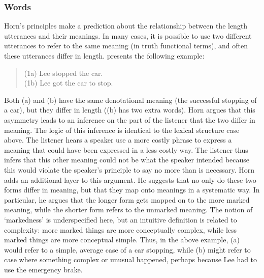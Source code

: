 \documentclass[man, noapacite, 12pt]{apa2}
\begin{document}
\subsubsection{Words}
Horn's principles make a prediction about the relationship between the length utterances and their meanings. In many cases, it is possible to use two different utterances to refer to the same meaning (in truth functional terms), and often these utterances differ in length.  presents the following example: 
\begin{quote} 
 	(1a) Lee stopped the car.\\
	(1b) Lee got the car to stop.
	
\end{quote}
Both (a) and (b) have the same denotational meaning (the successful stopping of a car), but they differ in length ((b) has two extra words). Horn argues that this asymmetry leads to an inference on the part of the listener that the two differ in meaning. The logic of this inference is  identical to the lexical structure case above. The listener hears a speaker use a more costly phrase to express a meaning that could have been expressed in a less costly way. The listener thus infers that this other meaning could not be what the speaker intended because this would violate the speaker's principle to say no more than is necessary. Horn adds an additional layer to this argument. He suggests that no only do these two forms differ in meaning, but that they map onto meanings in a systematic way. In particular, he argues that the longer form gets mapped on to the more marked meaning, while the shorter form refers to the unmarked meaning.  The notion of `markedness' is underspecified here, but an intuitive definition is related to complexity: more marked things are more conceptually complex, while less marked things are more conceptual simple.  Thus, in the above example, (a) would refer to a simple, average case of a car stopping, while (b) might refer to case where something complex or unusual happened, perhaps because Lee had to use the emergency brake.
\end{document}
